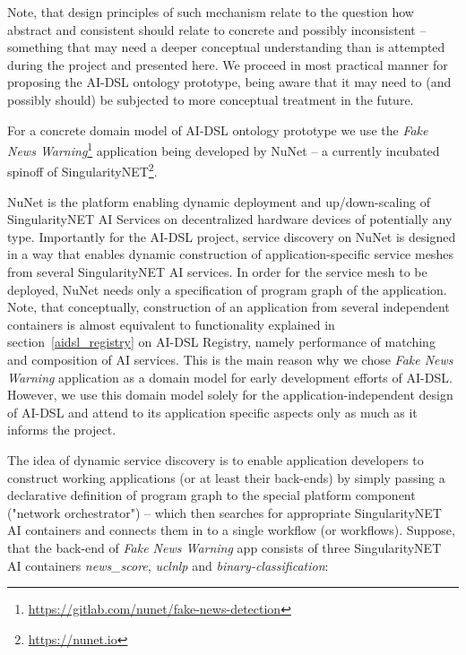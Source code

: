 \documentclass[]{report}
\begin{document}
Note, that design principles of such mechanism relate to the question how
abstract and consistent should relate to concrete and possibly inconsistent --
something that may need a deeper conceptual understanding than is attempted
during the project and presented here. We proceed in most practical manner for
proposing the AI-DSL ontology prototype, being aware that it may need to (and
possibly should) be subjected to more conceptual treatment in the future.

For a concrete domain model of AI-DSL ontology prototype we use the
\textit{Fake News
Warning}\footnote{\href{https://gitlab.com/nunet/fake-news-detection}{https://gitlab.com/nunet/fake-news-detection}}
application being developed by NuNet -- a currently incubated spinoff of
SingularityNET\footnote{\href{https://nunet.io}{https://nunet.io}}.

NuNet is the platform enabling dynamic deployment and up/down-scaling of
SingularityNET AI Services on decentralized hardware devices of potentially any
type. Importantly for the AI-DSL project, service discovery on NuNet is designed
in a way that enables dynamic construction of application-specific service
meshes from several SingularityNET AI services\cite{nunet_nunet_2021}. In order
for the service mesh to be deployed, NuNet needs only a specification of program
graph of the application. Note, that conceptually, construction of an
application from several independent containers is almost equivalent to
functionality explained in section~\ref{aidsl_registry} on AI-DSL Registry,
namely performance of matching and composition of AI services. This is the main
reason why we chose \textit{Fake News Warning} application as a domain model
for early development efforts of AI-DSL. However, we use this domain model
solely for the application-independent design of AI-DSL and attend to
its application specific aspects only as much as it informs the project.

The idea of dynamic service discovery is to enable application developers to
construct working applications (or at least their back-ends) by simply passing a
declarative definition of program graph to the special platform component
("network orchestrator") -- which then searches for appropriate SingularityNET
AI containers and connects them in to a single workflow (or workflows).
Suppose, that the back-end of \textit{Fake News Warning} app consists of three
SingularityNET AI containers \textit{news\_score}, \textit{uclnlp} and
\textit{binary-classification}:
\end{document}
